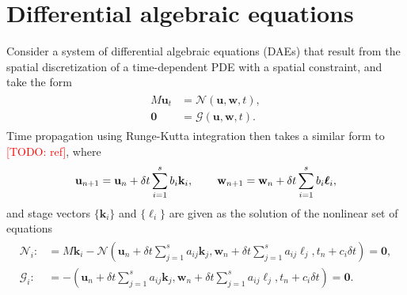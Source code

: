 \documentclass[a4paper,10pt]{article}
\makeatletter
\newcommand{\todo}[1]{\textcolor{red}{[TODO\@: #1]}}
\makeatother
\begin{document}
\allowdisplaybreaks

\section{Differential algebraic equations}

Consider a system of differential algebraic equations (DAEs) that result from
the spatial discretization of a time-dependent PDE with a spatial constraint,
and take the form
%
\begin{align}\label{eq:dae}
\begin{split}
M\mathbf{u}_t & = \mathcal{N}(\mathbf{u},\mathbf{w},t), \\
\mathbf{0} & = \mathcal{G}(\mathbf{u},\mathbf{w},t).
\end{split}
\end{align}
%
Time propagation using Runge-Kutta integration then takes a similar form to
\todo{ref}, where
%
\begin{align*}
\mathbf{u}_{n+1} = \mathbf{u}_n + \delta t\sum_{i=1}^s b_i\mathbf{k}_i, \hspace{5ex}
\mathbf{w}_{n+1} = \mathbf{w}_n + \delta t\sum_{i=1}^s b_i\boldsymbol{\ell}_i,
\end{align*}
%
and stage vectors $\{\mathbf{k}_i\}$ and $\{\boldsymbol{\ell}_i\}$ are
given as the solution of the nonlinear set of equations
%
\begin{align}\label{eq:dae_stage}
\begin{split}
\mathcal{N}_i :&= M\mathbf{k}_i -
	\mathcal{N} \left (\mathbf{u}_{n} + \delta t\sum_{j=1}^s a_{ij}\mathbf{k}_j,
	\mathbf{w}_{n} + \delta t\sum_{j=1}^s a_{ij}\boldsymbol{\ell}_j, t_{n} + c_i\delta t\right)
	= \mathbf{0}, \\
\mathcal{G}_i :&= - \left (\mathbf{u}_{n} + \delta t\sum_{j=1}^s a_{ij}\mathbf{k}_j,
	\mathbf{w}_{n} + \delta t\sum_{j=1}^s a_{ij}\boldsymbol{\ell}_j, t_{n} + c_i\delta t\right)
	= \mathbf{0}.
\end{split}
\end{align}
%
\end{document}
